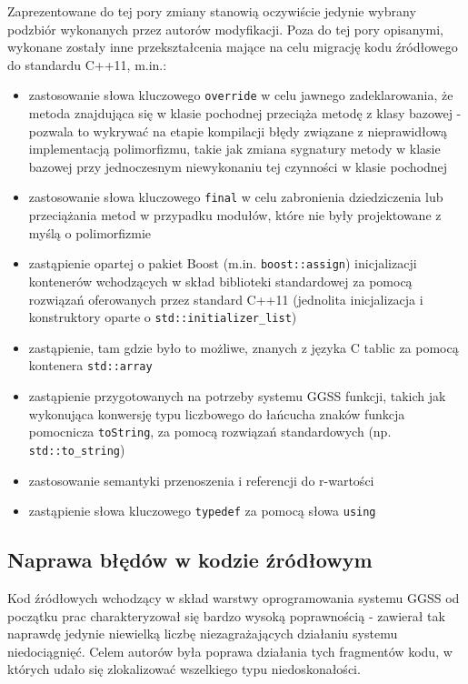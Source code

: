 Zaprezentowane do tej pory zmiany stanowią oczywiście jedynie wybrany podzbiór wykonanych przez autorów modyfikacji. Poza do tej pory opisanymi, wykonane zostały inne przekształcenia mające na celu migrację kodu źródłowego do standardu C++11, m.in.:
\begin{itemize}
    \item zastosowanie słowa kluczowego \lstinline{override} w celu jawnego zadeklarowania, że metoda znajdująca się w klasie pochodnej przeciąża metodę z klasy bazowej - pozwala to wykrywać na etapie kompilacji błędy związane z nieprawidłową implementacją polimorfizmu, takie jak zmiana sygnatury metody w klasie bazowej przy jednoczesnym niewykonaniu tej czynności w klasie pochodnej
    \item zastosowanie słowa kluczowego \lstinline{final} w celu zabronienia dziedziczenia lub przeciążania metod w przypadku modułów, które nie były projektowane z myślą o polimorfizmie
    \item zastąpienie opartej o pakiet Boost (m.in. \lstinline{boost::assign}) inicjalizacji kontenerów wchodzących w skład biblioteki standardowej za pomocą rozwiązań oferowanych przez standard C++11 (jednolita inicjalizacja i konstruktory oparte o \lstinline{std::initializer_list})
    \item zastąpienie, tam gdzie było to możliwe, znanych z języka C tablic za pomocą kontenera \lstinline{std::array}
    \item zastąpienie przygotowanych na potrzeby systemu GGSS funkcji, takich jak wykonująca konwersję typu liczbowego do łańcucha znaków funkcja pomocnicza \lstinline{toString}, za pomocą rozwiązań standardowych (np. \lstinline{std::to_string})
    \item zastosowanie semantyki przenoszenia i referencji do r-wartości
    \item zastąpienie słowa kluczowego \lstinline{typedef} za pomocą słowa \lstinline{using}
\end{itemize}

\clearpage
\subsection{Naprawa błędów w kodzie źródłowym}
Kod źródłowych wchodzący w skład warstwy oprogramowania systemu GGSS od początku prac charakteryzował się bardzo wysoką poprawnością - zawierał tak naprawdę jedynie niewielką liczbę niezagrażających działaniu systemu niedociągnięć. Celem autorów była poprawa działania tych fragmentów kodu, w których udało się zlokalizować wszelkiego typu niedoskonałości. 

